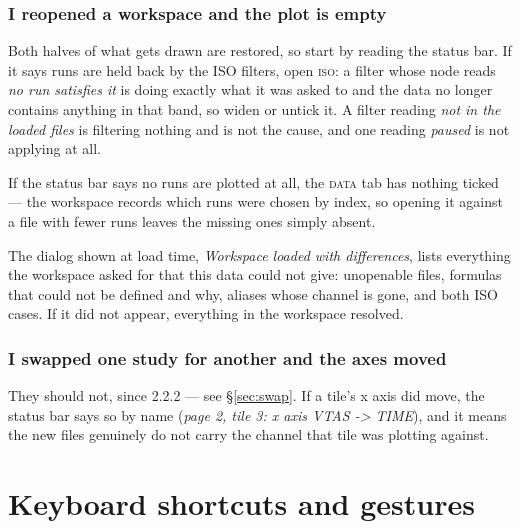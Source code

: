 \documentclass[11pt,a4paper,oneside]{report}
\newcommand{\appver}{2.2.2}
\newcommand{\tab}[1]{\textsc{#1}}
\begin{document}
\subsection{I reopened a workspace and the plot is empty}

Both halves of what gets drawn are restored, so start by reading the status bar.
If it says runs are held back by the ISO filters, open \tab{iso}: a filter whose
node reads \emph{no run satisfies it} is doing exactly what it was asked to and
the data no longer contains anything in that band, so widen or untick it. A
filter reading \emph{not in the loaded files} is filtering nothing and is not
the cause, and one reading \emph{paused} is not applying at all.

If the status bar says no runs are plotted at all, the \tab{data} tab has
nothing ticked --- the workspace records which runs were chosen by index, so
opening it against a file with fewer runs leaves the missing ones simply absent.

The dialog shown at load time, \emph{Workspace loaded with differences}, lists
everything the workspace asked for that this data could not give: unopenable
files, formulas that could not be defined and why, aliases whose channel is
gone, and both ISO cases. If it did not appear, everything in the workspace
resolved.

\subsection{I swapped one study for another and the axes moved}

They should not, since \appver{} --- see \S\ref{sec:swap}. If a tile's x axis
did move, the status bar says so by name (\emph{page 2, tile 3: x axis VTAS ->
TIME}), and it means the new files genuinely do not carry the channel that tile
was plotting against.

\appendix

\chapter{Keyboard shortcuts and gestures}
\end{document}

